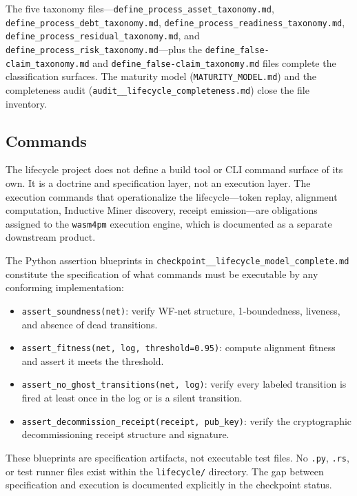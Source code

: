 The five taxonomy files---\texttt{define\_process\_asset\_taxonomy.md},
\texttt{define\_process\_debt\_taxonomy.md},
\texttt{define\_process\_readiness\_taxonomy.md},
\texttt{define\_process\_residual\_taxonomy.md}, and
\texttt{define\_process\_risk\_taxonomy.md}---plus the
\texttt{define\_false-claim\_taxonomy.md} and
\texttt{define\_false-claim\_taxonomy.md} files complete the classification surfaces.
The maturity model (\texttt{MATURITY\_MODEL.md}) and the completeness audit
(\texttt{audit\_\_lifecycle\_completeness.md}) close the file inventory.

\subsection{Commands}
\label{sec:lifecycle-implementation-commands}

The lifecycle project does not define a build tool or CLI command surface of its own.
It is a doctrine and specification layer, not an execution layer. The execution commands
that operationalize the lifecycle---token replay, alignment computation, Inductive Miner
discovery, receipt emission---are obligations assigned to the \texttt{wasm4pm} execution
engine, which is documented as a separate downstream product.

The Python assertion blueprints in \texttt{checkpoint\_\_lifecycle\_model\_complete.md}
constitute the specification of what commands must be executable by any conforming
implementation:
\begin{itemize}
  \item \texttt{assert\_soundness(net)}: verify WF-net structure, 1-boundedness, liveness,
    and absence of dead transitions.
  \item \texttt{assert\_fitness(net, log, threshold=0.95)}: compute alignment fitness and
    assert it meets the threshold.
  \item \texttt{assert\_no\_ghost\_transitions(net, log)}: verify every labeled transition
    is fired at least once in the log or is a silent transition.
  \item \texttt{assert\_decommission\_receipt(receipt, pub\_key)}: verify the
    cryptographic decommissioning receipt structure and signature.
\end{itemize}

These blueprints are specification artifacts, not executable test files. No \texttt{.py},
\texttt{.rs}, or test runner files exist within the \texttt{lifecycle/} directory. The
gap between specification and execution is documented explicitly in the checkpoint status.

